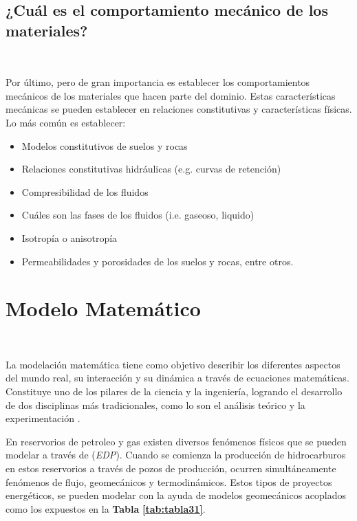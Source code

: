 \subsection{¿Cuál es el comportamiento mecánico de los materiales?}~\hypertarget{sec:sec313}{}
\label{sec:sec313}

Por último, pero de gran importancia es establecer los comportamientos mecánicos de los materiales que hacen parte del dominio. Estas características mecánicas se pueden establecer en relaciones constitutivas y características físicas. Lo más común es establecer:

\begin{itemize}
    \item Modelos constitutivos de suelos y rocas
    \item Relaciones constitutivas hidráulicas (e.g. curvas de retención)
    \item Compresibilidad de los fluidos
    \item Cuáles son las fases de los fluidos (i.e. gaseoso, liquido)
    \item Isotropía o anisotropía
    \item Permeabilidades y porosidades de los suelos y rocas, entre otros.
\end{itemize}



\section{Modelo Matemático}~\hypertarget{sec:sec320}{}
\label{sec:sec320}

La modelación matemática tiene como objetivo describir los diferentes aspectos del mundo real, su interacción y su dinámica a través de ecuaciones matemáticas. Constituye uno de los pilares de la ciencia y la ingeniería, logrando el desarrollo de dos disciplinas más tradicionales, como lo son el análisis teórico y la experimentación  \cite{Quarteroni2009MathematicalEngineering}.\bigskip

En reservorios de petroleo y gas existen diversos fenómenos físicos que se pueden modelar a través de (\textit{EDP}). Cuando se comienza la producción de hidrocarburos en estos reservorios a través de pozos de producción, ocurren simultáneamente fenómenos de flujo, geomecánicos y termodinámicos. Estos tipos de proyectos energéticos, se pueden modelar con la ayuda de modelos geomecánicos acoplados como los expuestos en la \textbf{Tabla} \textbf{\ref{tab:tabla31}}.\bigskip

